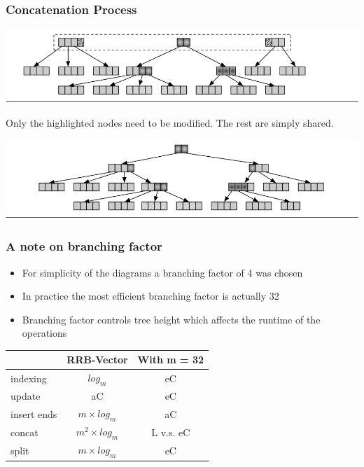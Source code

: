 \documentclass{beamer}
\begin{document}
\begin{frame}
\frametitle{Concatenation Process}

	\begin{center}
	
	\includegraphics[scale=0.3]{concat3.png}
	
	\end{center}
	
	Only the highlighted nodes need to be modified. The rest are simply shared.	
	
	\begin{center}
	
	\includegraphics[scale=0.3]{concat4.png}
	
	\end{center}
\end{frame}

\begin{frame}
\frametitle{A note on branching factor}

	\begin{itemize}
		\item For simplicity of the diagrams a branching factor of 4 was chosen
		\item In practice the most efficient branching factor is actually 32
		\item Branching factor controls tree height which affects the runtime of the operations
	\end{itemize}
	\pause
	\begin{center}
	\begin{tabular}{| l || c | c |}
		\hline
		& RRB-Vector & With m = 32 \\
		\hline
		indexing & $ log_m $ & eC\\
		update & aC & eC \\
		insert ends & $ m \times log_m $ & aC \\
		concat & $ m^2 \times log_m $ & L v.s. eC \\
		split & $ m \times log_m $ & eC \\
		\hline
		\end{tabular}
	\end{center}


\end{frame}
\end{document}
